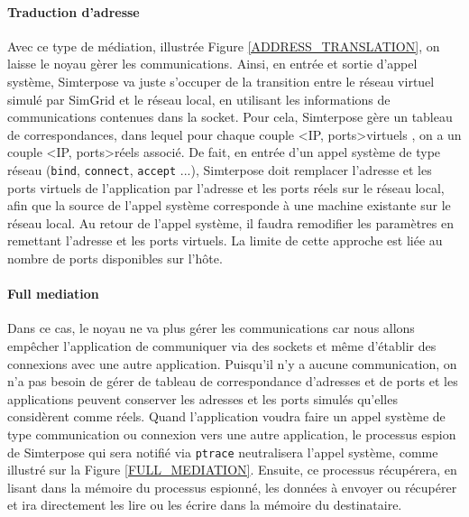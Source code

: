 \paragraph{Traduction d'adresse}
 Avec ce type de médiation, illustrée Figure \ref{ADDRESS_TRANSLATION}, on laisse le noyau gèrer les communications. Ainsi, en entrée et sortie d'appel système, Simterpose va juste s'occuper de la transition entre le réseau virtuel simulé
 par SimGrid et le réseau local, en utilisant les informations de communications
 contenues dans la socket. Pour cela, Simterpose gère un tableau de
 correspondances, dans lequel pour chaque couple <IP, ports>virtuels , on a un
 couple <IP, ports>réels associé.  De fait, en entrée d'un appel système de
 type réseau (\texttt{bind}, \texttt{connect}, \texttt{accept} ...), Simterpose
 doit remplacer l'adresse et les ports virtuels de l'application par l'adresse
 et les ports réels sur le réseau local, afin que la source de l'appel système
 corresponde à une machine existante sur le réseau local. Au retour de l'appel
 système, il faudra remodifier les paramètres en remettant l'adresse et les
 ports virtuels. La limite de cette approche est liée au nombre de
 ports disponibles sur l'hôte.

\paragraph{Full mediation} \label{paragraph:FULL_MEDIATION}
Dans ce cas, le noyau ne va plus gérer les communications car nous allons
empêcher l'application de communiquer via des sockets et même d'établir des
connexions avec une autre application. Puisqu'il n'y a aucune communication, on
n'a pas besoin de gérer de tableau de correspondance d'adresses et de ports et
les applications peuvent conserver les adresses et les ports simulés qu'elles
considèrent comme réels. Quand l'application voudra faire un appel système de
type communication ou connexion vers une autre application, le processus espion
de Simterpose qui sera notifié via \texttt{ptrace} neutralisera l'appel système,
comme illustré sur la Figure \ref{FULL_MEDIATION}. Ensuite, ce processus
récupérera, en lisant dans la mémoire du processus espionné, les données à
envoyer ou récupérer et ira directement les lire ou les écrire dans la mémoire
du destinataire.

